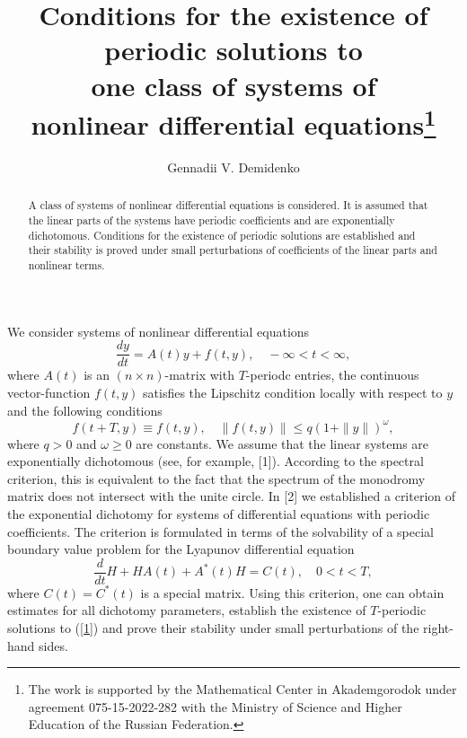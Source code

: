 \documentclass[12pt]{llncs}
\begin{document}
\fi

\title{Conditions for the existence of periodic solutions to \\ one class of systems of \\ nonlinear differential equations\thanks{The work is supported 
by the Mathematical Center in Akademgorodok under agreement 075-15-2022-282 
with the Ministry of Science and Higher Education of the Russian Federation.}}

\author{Gennadii V. Demidenko
}

\maketitle

\begin{abstract}
A class of systems of nonlinear differential equations is considered.
It is assumed that the linear parts of the systems have periodic coefficients
and are exponentially dichotomous.
Conditions for the existence of periodic solutions are established
and their stability is proved under small perturbations of coefficients
of the linear parts and nonlinear terms.
\end{abstract}

We consider systems of nonlinear differential equations
\begin{equation}\label{1}
\frac{dy}{dt} = A(t)y + f(t,y), \quad -\infty < t< \infty,
\end{equation}
where
$A(t)$
is an $(n\times n)$-matrix with $T$-periodc entries, 
the continuous vector-function
$f(t,y)$
satisfies the Lipschitz condition locally with respect to
$y$ 
and the following conditions
\begin{equation}\label{2}
f(t + T, y) \equiv f(t,y), \quad \|f(t,y)\| \le q(1 + \|y\|)^{\omega}, 
\end{equation}
where
$q > 0$
and
$\omega \ge 0$
are constants. 
We assume that the linear systems are exponentially dichotomous (see, for example, [1]). 
According to the spectral criterion, this is equivalent to the fact that the spectrum 
of the monodromy matrix does not intersect with the unite circle. In [2]  
we established a criterion of the exponential dichotomy for systems of differential equations 
with periodic coefficients. The criterion is formulated in terms of the solvability of a special 
boundary value problem for the Lyapunov differential equation 
$$
\frac{d}{dt}H + HA(t) + A^*(t)H = C(t), \quad 0 < t < T,
$$ 
where 
$C(t) = C^*(t)$ 
is a special matrix. 
Using this criterion, one can obtain estimates for all dichotomy parameters,  
establish the existence of 
$T$-periodic solutions to (\ref{1})  
and prove their stability under small perturbations of the right-hand sides.
\end{document}
